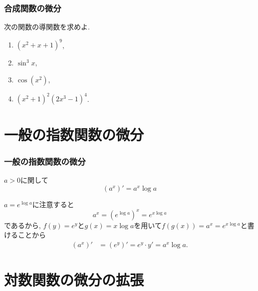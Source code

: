\begin{frame}
\frametitle{合成関数の微分}


\begin{Prob}
次の関数の導関数を求めよ. 
\begin{enumerate}
\item $(x^2+x+1)^9$, 
\item $\sin^3 x$, 
\item $\cos( x^2)$, 
\item $(x^2+1)^2(2x^3-1)^4$. 
\end{enumerate}
\end{Prob}


\end{frame}







\section{一般の指数関数の微分}


\begin{frame}
\frametitle{一般の指数関数の微分}


\begin{Thm} 
$a>0$に関して
$$(a^x)'=a^x \log a$$
\end{Thm}

$a=e^{\log a}$に注意すると
$$
a^x=(e^{\log a})^x=e^{x \log a}
$$
であるから, 
$f(y)=e^y$と$g(x)=x \log a$を用いて$f(g(x))=a^x=e^{x \log a}$と書けることから
\begin{align*} 
(a^x)' &= (e^y)'  =e^y \cdot y' =a^x \log a. 
\end{align*}


\end{frame}




\section{対数関数の微分の拡張}

